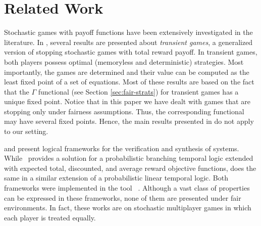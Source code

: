 	
	
	

\section{Related Work} \label{sec:related_work}

Stochastic games with payoff functions have been extensively investigated in the literature. In \cite{FilarV96}, several results are presented about \emph{transient games},
a generalized version of stopping stochastic games with total reward payoff. 
In transient games, both players possess optimal (memoryless and deterministic) strategies. 
Most importantly, the games are determined and their value can be computed as the least fixed point of a set of equations. 
Most of these results are based on the fact that the $\Gamma$ functional (see Section \ref{sec:fair-strats}) for transient games has a unique fixed point.
Notice that in this paper we have dealt with games that are stopping only under fairness assumptions. Thus, the corresponding functional 
may have several fixed points. Hence, the main results presented in \cite{FilarV96} do not apply to our setting.


\cite{DBLP:journals/fmsd/ChenFKPS13} and \cite{SvorenovaKwiatkowska16} present logical frameworks for the verification and synthesis of systems.  While~\cite{DBLP:journals/fmsd/ChenFKPS13} provides a solution for a  probabilistic branching temporal logic extended with expected total, discounted, and average reward objective functions, \cite{SvorenovaKwiatkowska16} does the same in a similar extension of a probabilistic linear temporal logic. Both frameworks were implemented in the tool \Prism~\cite{DBLP:conf/cav/KwiatkowskaN0S20,DBLP:conf/cav/KwiatkowskaNP11}.  Although a vast class of properties can be expressed in these frameworks, none of them are presented under fair environments.  In fact, these works are on stochastic multiplayer games in which each player is treated equally.


